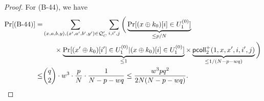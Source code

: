 \begin{proof}
For (B-44), we have          {\small
%
%
\begin{align*}
\Pr[\text{(B-44)}]  
=   &  \sum_{(x,a,b,y),(x',a',b',y')\in\mathcal{Q}_{C}'}\sum_{i,i',j}\bigg(\underbrace{\Pr[(x\xor k_0)[i]\in U_1^{(0)}]}_{\leq p/N}     \\
   & \midindent\times
	\underbrace{\Pr[(x'\xor k_0)[i']\in U_1^{(0)}|(x\xor k_0)[i]\in U_1^{(0)}]}_{\leq1}\times\underbrace{\pcoll_2^+(1,x,x',i,i',j)}_{\leq1/(N-p-wq)}\bigg)      \\
\leq  &   {q\choose 2}\cdot w^3\cdot\frac{p}{N}\cdot\frac{1}{N-p-wq}\leq
\frac{w^3pq^2}{2N(N-p-wq)}.
%
\end{align*}
}%
%






\end{proof}

